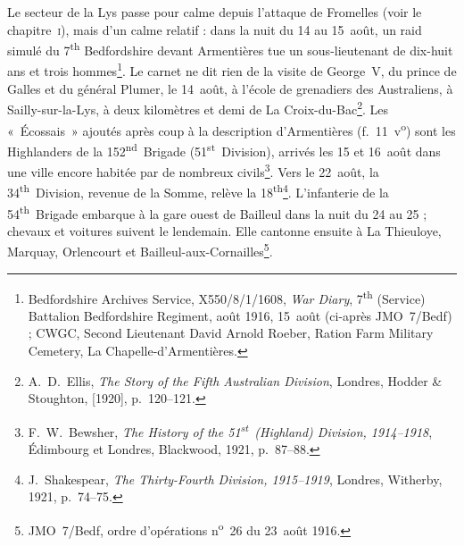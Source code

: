 Le secteur de la Lys passe pour calme depuis l'attaque de Fromelles (voir le chapitre~\textsc{i}), mais d'un calme relatif : dans la nuit du 14 au 15~août, un raid simulé du 7\textsuperscript{th} Bedfordshire devant Armentières tue un sous-lieutenant de dix-huit ans et trois hommes\footnote{Bedfordshire Archives Service, X550/8/1/1608, \textit{War Diary}, 7\textsuperscript{th} (Service) Battalion Bedfordshire Regiment, août 1916, 15~août (ci-après JMO~7/Bedf) ; CWGC, Second Lieutenant David Arnold Roeber, Ration Farm Military Cemetery, La Chapelle-d'Armentières.}. Le carnet ne dit rien de la visite de George~V, du prince de Galles et du général Plumer, le 14~août, à l'école de grenadiers des Australiens, à Sailly-sur-la-Lys, à deux kilomètres et demi de La Croix-du-Bac\footnote{A.~D.~Ellis, \textit{The Story of the Fifth Australian Division}, Londres, Hodder \& Stoughton, [1920], p.~120--121.}. Les «~Écossais~» ajoutés après coup à la description d'Armentières (f.~11~v\textsuperscript{o}) sont les Highlanders de la 152\textsuperscript{nd}~Brigade (51\textsuperscript{st}~Division), arrivés les 15 et 16~août dans une ville encore habitée par de nombreux civils\footnote{F.~W.~Bewsher, \textit{The History of the 51\textsuperscript{st}~(Highland) Division, 1914--1918}, Édimbourg et Londres, Blackwood, 1921, p.~87--88.}. Vers le 22~août, la 34\textsuperscript{th}~Division, revenue de la Somme, relève la 18\textsuperscript{th}\footnote{J.~Shakespear, \textit{The Thirty-Fourth Division, 1915--1919}, Londres, Witherby, 1921, p.~74--75.}. L'infanterie de la 54\textsuperscript{th}~Brigade embarque à la gare ouest de Bailleul dans la nuit du 24 au 25 ; chevaux et voitures suivent le lendemain. Elle cantonne ensuite à La Thieuloye, Marquay, Orlencourt et Bailleul-aux-Cornailles\footnote{JMO~7/Bedf, ordre d'opérations n\textsuperscript{o}~26 du 23~août 1916.}.

